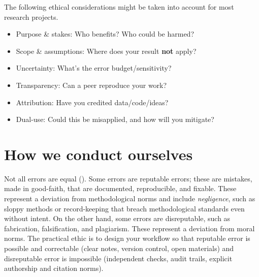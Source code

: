 \documentclass[
  a4paper,
  DIV=11,
  numbers=noendperiod,
  oneside]{scrreprt}
\providecommand{\tightlist}{%
  \setlength{\itemsep}{0pt}\setlength{\parskip}{0pt}}
\begin{document}
\begin{tcolorbox}[enhanced jigsaw, opacitybacktitle=0.6, colframe=quarto-callout-tip-color-frame, bottomrule=.15mm, coltitle=black, colback=white, title=\textcolor{quarto-callout-tip-color}{\faLightbulb}\hspace{0.5em}{A quick ethics checklist}, breakable, toptitle=1mm, arc=.35mm, left=2mm, opacityback=0, rightrule=.15mm, bottomtitle=1mm, colbacktitle=quarto-callout-tip-color!10!white, toprule=.15mm, leftrule=.75mm, titlerule=0mm]

The following ethical considerations might be taken into account for
most research projects.

\begin{itemize}
\tightlist
\item
  Purpose \& stakes: Who benefits? Who could be harmed?\\
\item
  Scope \& assumptions: Where does your result \textbf{not} apply?\\
\item
  Uncertainty: What's the error budget/sensitivity?\\
\item
  Transparency: Can a peer reproduce your work?\\
\item
  Attribution: Have you credited data/code/ideas?\\
\item
  Dual-use: Could this be misapplied, and how will you mitigate?
\end{itemize}

\end{tcolorbox}

\section{How we conduct ourselves}\label{how-we-conduct-ourselves}

Not all errors are equal ().
Some errors are reputable errors; these are mistakes, made in
good-faith, that are documented, reproducible, and fixable. These
represent a deviation from methodological norms and include
\emph{negligence}, such as sloppy methods or record-keeping that breach
methodological standards even without intent. On the other hand, some
errors are disreputable, such as fabrication, falsification, and
plagiarism. These represent a deviation from moral norms. The practical
ethic is to design your workflow so that reputable error is possible and
correctable (clear notes, version control, open materials) and
disreputable error is impossible (independent checks, audit trails,
explicit authorship and citation norms).
\end{document}
